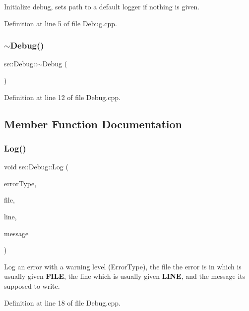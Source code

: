 Initialize debug, sets path to a default logger if nothing is given. 

Definition at line 5 of file Debug.\+cpp.

\mbox{\label{classse_1_1_debug_a2ff6371c83b2a8918b15907bd1491ac9}} 
\subsubsection{\texorpdfstring{$\sim$\+Debug()}{~Debug()}}
{\footnotesize\ttfamily se\+::\+Debug\+::$\sim$\+Debug (\begin{DoxyParamCaption}{ }\end{DoxyParamCaption})}



Definition at line 12 of file Debug.\+cpp.



\subsection{Member Function Documentation}
\mbox{\label{classse_1_1_debug_a3ebaea1144b70d56762d2b1054c8251d}} 
\subsubsection{\texorpdfstring{Log()}{Log()}}
{\footnotesize\ttfamily void se\+::\+Debug\+::\+Log (\begin{DoxyParamCaption}\item[{\mbox{\hyperlink{namespacese_aaa5cbe4d4821d8a349338e23de6ef9c4}{Error\+Type}}}]{error\+Type,  }\item[{const std\+::string \&}]{file,  }\item[{int}]{line,  }\item[{const std\+::string \&}]{message }\end{DoxyParamCaption})}

Log an error with a warning level (Error\+Type), the file the error is in which is usually given {\bfseries F\+I\+LE}, the line which is usually given {\bfseries L\+I\+NE}, and the message it\textquotesingle{}s supposed to write. 

Definition at line 18 of file Debug.\+cpp.

